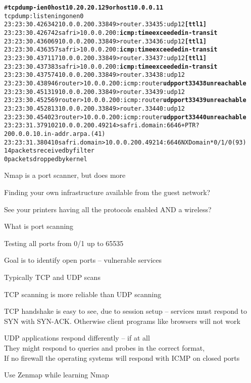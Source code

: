 \documentclass[Screen16to9,17pt]{foils}
\begin{document}

\begin{alltt}
\footnotesize # {\bfseries tcpdump -i en0 host 10.20.20.129 or host 10.0.0.11}
tcpdump: listening on en0
23:23:30.426342 10.0.0.200.33849 > router.33435: udp 12 {\bf [ttl 1]}
23:23:30.426742 safri > 10.0.0.200: {\bf icmp: time exceeded in-transit}
23:23:30.436069 10.0.0.200.33849 > router.33436: udp 12 {\bf [ttl 1]}
23:23:30.436357 safri > 10.0.0.200: {\bf icmp: time exceeded in-transit}
23:23:30.437117 10.0.0.200.33849 > router.33437: udp 12 {\bf [ttl 1]}
23:23:30.437383 safri > 10.0.0.200: {\bf icmp: time exceeded in-transit}
23:23:30.437574 10.0.0.200.33849 > router.33438: udp 12
23:23:30.438946 router > 10.0.0.200: icmp: router {\bf udp port 33438 unreachable}
23:23:30.451319 10.0.0.200.33849 > router.33439: udp 12
23:23:30.452569 router > 10.0.0.200: icmp: router {\bf udp port 33439 unreachable}
23:23:30.452813 10.0.0.200.33849 > router.33440: udp 12
23:23:30.454023 router > 10.0.0.200: icmp: router {\bf udp port 33440 unreachable}
23:23:31.379102 10.0.0.200.49214 > safri.domain:  6646+ PTR?
200.0.0.10.in-addr.arpa. (41)
23:23:31.380410 safri.domain > 10.0.0.200.49214:  6646 NXDomain* 0/1/0 (93)
14 packets received by filter
0 packets dropped by kernel
\end{alltt}



\begin{list2}
\item Nmap is a port scanner, but does more
\item Finding your own infrastructure available from the guest network?
\item See your printers having all the protocols enabled AND a wireless?
\end{list2}


\begin{list1}
\item What is port scanning
\item Testing all ports from 0/1 up to 65535
\item Goal is to identify open ports -- vulnerable services
\item Typically TCP and UDP scans
\item TCP scanning is more reliable than UDP scanning
\item TCP handshake is easy to see, due to session setup -- services must respond to SYN with SYN-ACK. Otherwise client programs like browsers will not work
\item UDP applications respond differently -- if at all\\
They might respond to queries and probes in the correct format, \\
If no firewall the operating systems will respond with ICMP on closed ports
\item Use Zenmap while learning Nmap
\end{list1}
\end{document}
